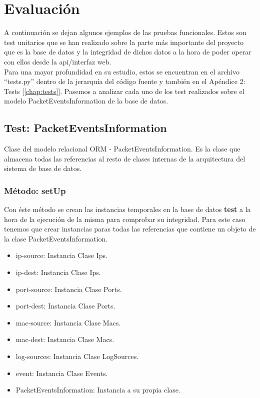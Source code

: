 \chapter{Evaluación}
\label{chap:evaluación}

A continuación se dejan algunos ejemplos de las pruebas funcionales. Estos son test unitarios que se han realizado sobre la parte más importante del proyecto que es la base de datos y la integridad de dichos datos a la hora de poder operar con ellos desde la api/interfaz web.\\

Para una mayor profundidad en su estudio, estos se encuentran en el archivo ``tests.py'' dentro de la jerarquía del código fuente y también en el Apéndice 2: Tests [\ref{chap:tests}]. Pasemos a analizar cada uno de los test realizados sobre el modelo PacketEventsInformation de la base de datos.\\

\section{Test: PacketEventsInformation}

Clase del modelo relacional ORM - PacketEventsInformation. Es la clase que almacena todas las referencias al resto de clases internas de la arquitectura del sistema de base de datos.\\



\subsection{Método: setUp}
Con éste método se crean las instancias temporales en la base de datos \textbf{test} a la hora de la ejecución de la misma para comprobar su integridad. Para este caso tenemos que crear instancias paras todas las referencias que contiene un objeto de la clase PacketEventsInformation.



\begin{itemize}
\item ip-source: Instancia Clase Ips.
\item ip-dest: Instancia Clase Ips.
\item port-source: Instancia Clase Ports.
\item port-dest: Instancia Clase Ports.
\item mac-source: Instancia Clase Macs.
\item mac-dest: Instancia Clase Macs.
\item log-sources: Instancia Clase LogSources.
\item event: Instancia Clase Events.
\item PacketEventsInformation: Instancia a su propia clase.
\end{itemize}

